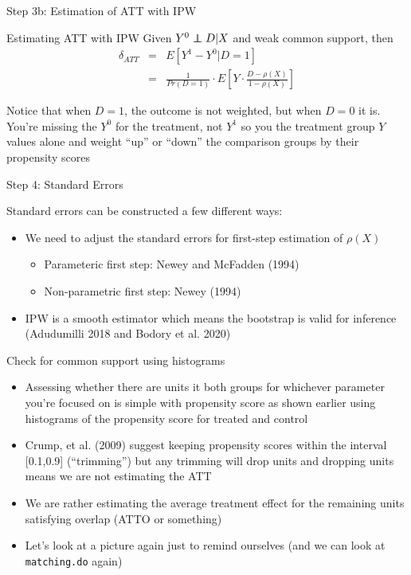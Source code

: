 \documentclass{beamer}
\newcommand\independent{\protect\mathpalette{\protect\independenT}{\perp}}
\def\independenT#1#2{\mathrel{\rlap{$#1#2$}\mkern2mu{#1#2}}}
\begin{document}
	

\begin{frame}{Step 3b: Estimation of ATT with IPW}
	
		\begin{block}{Estimating ATT with IPW}
	Given $Y^0 \independent{D}|X$ and weak common support, then
		\begin{eqnarray*}
		\delta_{ATT}&=&E[Y^1-Y^0|D=1] \\
		&=& \frac{1}{Pr(D=1)} \cdot  E \left[ Y \cdot \frac{D-\rho(X)}{1-\rho(X)} \right]
		\end{eqnarray*}
	\end{block}Notice that when $D=1$, the outcome is not weighted, but when $D=0$ it is. You're missing the $Y^0$ for the treatment, not $Y^1$ so you the treatment group $Y$ values alone and weight ``up'' or ``down'' the comparison groups by their propensity scores

\end{frame}


\begin{frame}{Step 4: Standard Errors}
	
		
Standard errors can be constructed a few different ways:
	\begin{itemize}
	\item We need to adjust the standard errors for first-step estimation of $\rho(X)$
		\begin{itemize}
		\item Parameteric first step: Newey and McFadden (1994)
		\item Non-parametric first step: Newey (1994)
		\end{itemize}
	\item IPW is a smooth estimator which means the bootstrap is valid for inference  (Adudumilli 2018 and Bodory et al. 2020) 
	\end{itemize}
\end{frame}


\begin{frame}{Check for common support using histograms}

\begin{itemize}

\item Assessing whether there are units it both groups for whichever parameter you're focused on is simple with propensity score as shown earlier using histograms of the propensity score for treated and control
\item Crump, et al. (2009) suggest keeping propensity scores within the interval [0.1,0.9] (``trimming'') but any trimming will drop units and dropping units means we are not estimating the ATT
\item We are rather estimating the average treatment effect for the remaining units satisfying overlap (ATTO or something)
\item Let's look at a picture again just to remind ourselves (and we can look at \texttt{matching.do} again)

\end{itemize}

\end{frame}
\end{document}
